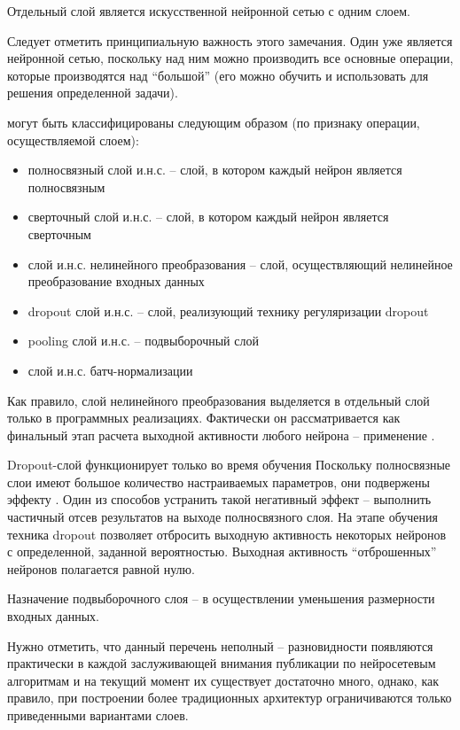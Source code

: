 Отдельный слой является искусственной нейронной сетью с одним слоем.

Следует отметить принципиальную важность этого замечания. Один   уже является нейронной сетью, поскольку над ним можно производить все основные операции, которые производятся над ``большой''  (его можно обучить и использовать для решения определенной задачи).

 могут быть классифицированы следующим образом (по признаку операции, осуществляемой слоем):
\begin{itemize}
		\item полносвязный слой и.н.с. -- слой, в котором каждый нейрон является полносвязным
		\item сверточный слой и.н.с. -- слой, в котором каждый нейрон является сверточным
		\item слой и.н.с. нелинейного преобразования -- слой, осуществляющий нелинейное преобразование входных данных
		\item dropout слой и.н.с. -- слой, реализующий технику регуляризации dropout
		\item pooling слой и.н.с. -- подвыборочный слой
		\item слой и.н.с. батч-нормализации
\end{itemize}

Как правило, слой нелинейного преобразования  выделяется в отдельный слой только в программных реализациях. Фактически он рассматривается как финальный этап расчета выходной активности любого нейрона -- применение .

Dropout-слой функционирует только во время обучения  Поскольку полносвязные слои имеют большое количество настраиваемых параметров, они подвержены эффекту . Один из способов устранить такой негативный эффект -- выполнить частичный отсев результатов на выходе полносвязного слоя. На этапе обучения техника dropout позволяет отбросить выходную активность некоторых нейронов с определенной, заданной вероятностью. Выходная активность ``отброшенных'' нейронов полагается равной нулю.

Назначение подвыборочного слоя -- в осуществлении уменьшения размерности входных данных.

Нужно отметить, что данный перечень неполный -- разновидности  появляются практически в каждой заслуживающей внимания публикации по нейросетевым алгоритмам и на текущий момент их существует достаточно много, однако, как правило, при построении более традиционных архитектур ограничиваются только приведенными вариантами слоев.

